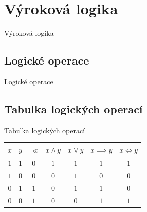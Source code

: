 \documentclass[11pt,professionalfont,aspectratio=43]{beamer}
\begin{document}
    

    \section{Výroková logika}

    \begin{titleframeenv}{Výroková logika}
    \end{titleframeenv}

    \subsection{Logické operace}

    \begin{frame}{Logické operace}
        \begin{itemize}
        \end{itemize}
    \end{frame}

    \subsection{Tabulka logických operací}

    \begin{frame}{Tabulka logických operací}
        \begin{table}
            \centering
            \begin{tabular}{cc|ccccc}
                $x$ & $y$ & $\neg x$ & $x\land y$  & $x\lor y$ & $x\implies y$ & $x\iff y$ \\ \hline
                $1$ & $1$ & $0$      & $1$         & $1$       & $1$           & $1$       \\
                $1$ & $0$ & $0$      & $0$         & $1$       & $0$           & $0$       \\
                $0$ & $1$ & $1$      & $0$         & $1$       & $1$           & $0$       \\
                $0$ & $0$ & $1$      & $0$         & $0$       & $1$           & $1$
            \end{tabular}
        \end{table}
    \end{frame}
\end{document}
